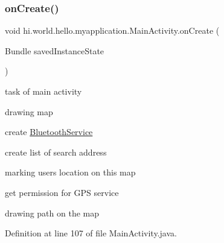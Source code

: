 \subsubsection{\texorpdfstring{onCreate()}{onCreate()}}
{\footnotesize\ttfamily void hi.\+world.\+hello.\+myapplication.\+Main\+Activity.\+on\+Create (\begin{DoxyParamCaption}\item[{Bundle}]{saved\+Instance\+State }\end{DoxyParamCaption})\hspace{0.3cm}{\ttfamily [protected]}}



task of main activity 


\begin{DoxyItemize}
\item drawing map
\item create \mbox{\hyperlink{classhi_1_1world_1_1hello_1_1myapplication_1_1_bluetooth_service}{Bluetooth\+Service}}
\item create list of search address
\item marking user\textquotesingle{}s location on this map
\item get permission for G\+PS service
\item drawing path on the map 
\end{DoxyItemize}

Definition at line 107 of file Main\+Activity.\+java.


